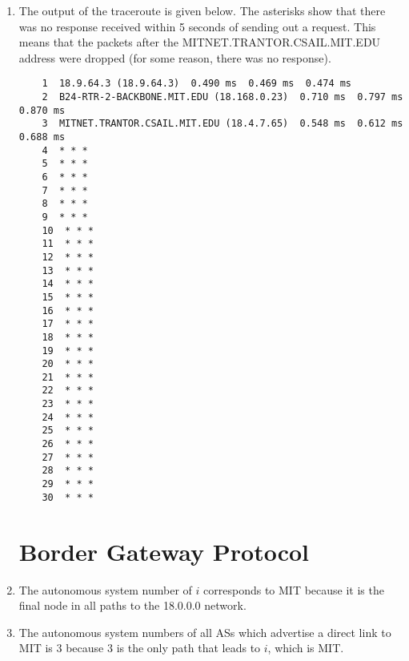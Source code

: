 \documentclass[psamsfonts]{amsart}
\begin{document}
\begin{enumerate}
  \item The output of the traceroute is given below. The asterisks show that there was no response received within 5 seconds of sending out a request. This means that the packets after the MITNET.TRANTOR.CSAIL.MIT.EDU address were dropped (for some reason, there was no response).
    \begin{verbatim}
    1  18.9.64.3 (18.9.64.3)  0.490 ms  0.469 ms  0.474 ms
    2  B24-RTR-2-BACKBONE.MIT.EDU (18.168.0.23)  0.710 ms  0.797 ms  0.870 ms
    3  MITNET.TRANTOR.CSAIL.MIT.EDU (18.4.7.65)  0.548 ms  0.612 ms  0.688 ms
    4  * * *
    5  * * *
    6  * * *
    7  * * *
    8  * * *
    9  * * *
    10  * * *
    11  * * *
    12  * * *
    13  * * *
    14  * * *
    15  * * *
    16  * * *
    17  * * *
    18  * * *
    19  * * *
    20  * * *
    21  * * *
    22  * * *
    23  * * *
    24  * * *
    25  * * *
    26  * * *
    27  * * *
    28  * * *
    29  * * *
    30  * * *
    \end{verbatim}

    \section{Border Gateway Protocol}

  \item The autonomous system number of $i$ corresponds to MIT because it is the final node in all paths to the 18.0.0.0 network.

  \item The autonomous system numbers of all ASs which advertise a direct link to MIT is $3$ because $3$ is the only path that leads to $i$, which is MIT.

\end{enumerate}
\end{document}
